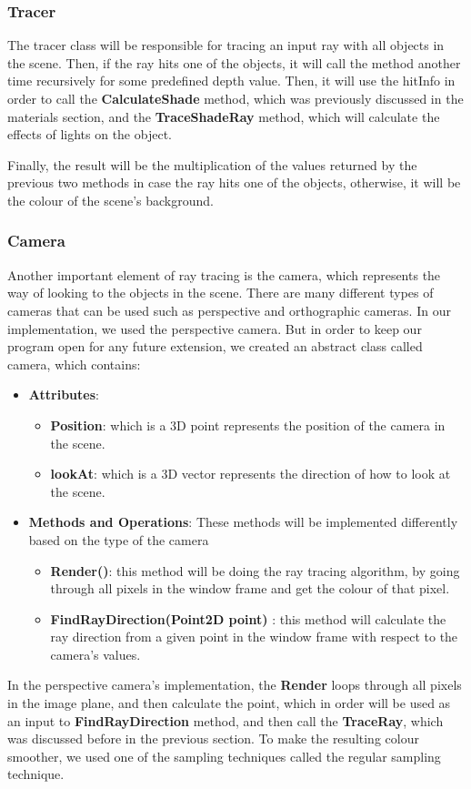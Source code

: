 \documentclass[a4paper]{article}
\begin{document}
	\subsubsection{Tracer}
	The tracer class will be responsible for tracing an input ray with all objects in the scene. Then, if the ray hits one of the objects, it will call the method another time recursively for some predefined depth value. Then, it will use the hitInfo in order to call the \textbf{CalculateShade} method, which was previously discussed in the materials section, and the \textbf{TraceShadeRay} method, which will calculate the effects of lights on the object.\\  
	\par Finally, the result will be the multiplication of the values returned by the previous two methods in case the ray hits one of the objects, otherwise, it will be the colour of the scene's background.
	\subsubsection{Camera}
	\label{sssec:cam}
	Another important element of ray tracing is the camera, which represents the way of looking to the objects in the scene. There are many different types of cameras that can be used such as perspective and orthographic cameras. In our implementation, we used the perspective camera. But in order to keep our program open for any future extension, we created an abstract class called camera, which contains:
	\begin{itemize}
		\item \textbf{Attributes}:
		\begin{itemize} 
			\item \textbf{Position}: which is a 3D point represents the position of the camera in the scene.
			\item \textbf{lookAt}: which is a 3D vector represents the direction of how to look at the scene.
		\end{itemize}
		\item \textbf{Methods and Operations}: These methods will be implemented differently based on the type of the camera
		\begin{itemize} 
			\item \textbf{Render()}: this method will be doing the ray tracing algorithm, by going through all pixels in the window frame and get the colour of that pixel.
			\item \textbf{FindRayDirection(Point2D point)} : this method will calculate the ray direction from a given point in the window frame with respect to the camera's values.
		\end{itemize}
	\end{itemize}
	\par In the perspective camera's implementation, the \textbf{Render} loops through all pixels in the image plane,  and then calculate the point, which in order will be used as an input to \textbf{FindRayDirection} method, and then call the \textbf{TraceRay}, which was discussed before in the previous section. To make the resulting colour smoother, we used one of the sampling techniques called the regular sampling technique.
\end{document}
